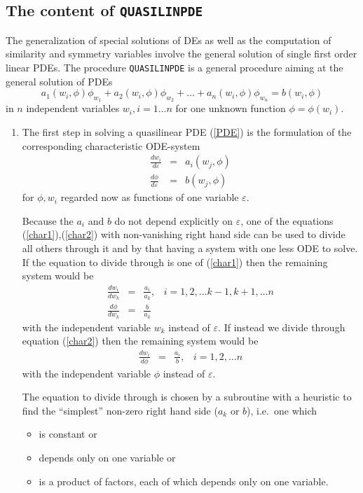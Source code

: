 \subsection{The content of {\tt QUASILINPDE}}
The generalization of special solutions of DEs as well as the computation of
similarity and symmetry variables involve the general solution of single
first order linear PDEs.
The procedure {\tt QUASILINPDE} is a general procedure
aiming at the general solution of
PDEs
\begin{equation}
   a_1(w_i,\phi)\phi_{w_1} + a_2(w_i,\phi)\phi_{w_2} + \ldots +
   a_n(w_i,\phi)\phi_{w_n} = b(w_i,\phi) \label{PDE}
\end{equation}
in $n$ independent variables $w_i, i=1\ldots n$ for one unknown function
$\phi=\phi(w_i)$.
\begin{enumerate}
\item
The first step in solving a quasilinear PDE (\ref{PDE})
is the formulation of the corresponding characteristic ODE-system
\begin{eqnarray}
\frac{dw_i}{d\varepsilon} & = & a_i(w_j,\phi) \label{char1}   \\
\frac{d\phi}{d\varepsilon} & = & b(w_j,\phi)  \label{char2}
\end{eqnarray}
for $\phi, w_i$ regarded now as functions of one variable $\varepsilon$.

Because the $a_i$ and $b$ do not depend explicitly on $\varepsilon$, one of the
equations (\ref{char1}),(\ref{char2}) with non-vanishing right hand side
can be used to divide all others through it and by that having a system
with one less ODE to solve.
If the equation to divide through is one of
(\ref{char1}) then the remaining system would be
\begin{eqnarray}
\frac{dw_i}{dw_k} & = & \frac{a_i}{a_k} , \;\;\;i=1,2,\ldots k-1,k+1,\ldots n
  \label{char3} \\
\frac{d\phi}{dw_k} & = & \frac{b}{a_k}  \label{char4}
\end{eqnarray}
with the independent variable $w_k$ instead of $\varepsilon$.
If instead we divide through equation
(\ref{char2}) then the remaining system would be
\begin{eqnarray}
\frac{dw_i}{d\phi} & = & \frac{a_i}{b} , \;\;\;i=1,2,\ldots n
  \label{char3a}
\end{eqnarray}
with the independent variable $\phi$ instead of $\varepsilon$.

The equation to divide through is chosen by a
subroutine with a heuristic to find the ``simplest'' non-zero
right hand side ($a_k$ or $b$), i.e.\ one which
\begin{itemize}
\item is constant or
\item depends only on one variable or
\item is a product of factors, each of which depends only on
one variable.
\end{itemize}


\end{enumerate}
